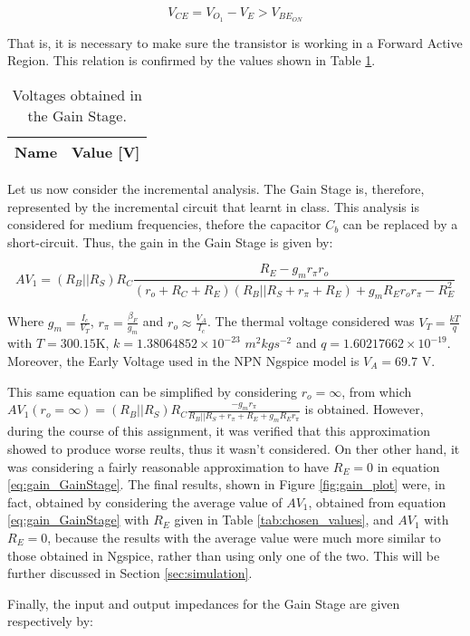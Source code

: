 \begin{equation} \label{eq:VCE}
  V_{CE}=V_{O_1}-V_E>V_{BE_{ON}}
\end{equation}

That is, it is necessary to make sure the transistor is working in a Forward Active Region. This relation is confirmed by the values shown in Table \ref{tab:vce_vbeon}.

\begin{table}[H]
  \centering
  \begin{tabular}{|c|c|}
    \hline    
    {\bf Name} & {\bf Value [V]} \\ \hline
    
  \end{tabular}
  \caption{Voltages obtained in the Gain Stage.}
  \label{tab:vce_vbeon}
\end{table}

Let us now consider the incremental analysis. The Gain Stage is, therefore, represented by the incremental circuit that learnt in class. This analysis is considered for medium frequencies, thefore the capacitor $C_b$ can be replaced by a short-circuit. Thus, the gain in the Gain Stage is given by:

\begin{equation} \label{eq:gain_GainStage}
  AV_1=(R_B||R_S)R_C\frac{R_E-g_mr_{\pi}r_o}{(r_o+R_C+R_E)(R_B||R_S+r_{\pi}+R_E)+g_mR_Er_or_{\pi}-R_E^2}
\end{equation}

Where $g_m=\frac{I_c}{V_T}$, $r_{\pi}=\frac{\beta_F}{g_m}$ and $r_o\approx\frac{V_A}{I_c}$. The thermal voltage considered was $V_T=\frac{kT}{q}$ with $T=300.15$K, $k=1.38064852\times10^{-23}$ $m^2kgs^{-2}$ and $q=1.60217662\times10^{-19}$. Moreover, the Early Voltage used in the NPN Ngspice model is $V_A=69.7$ V.
\par
This same equation can be simplified by considering $r_o=\infty$, from which $ AV_1 (r_o=\infty)=(R_B||R_S)R_C\frac{-g_mr_{\pi}}{R_B||R_S+r_{\pi}+R_E+g_mR_Er_{\pi}}$ is obtained. However, during the course of this assignment, it was verified that this approximation showed to produce worse reults, thus it wasn't considered. On ther other hand, it was considering a fairly reasonable approximation to have $R_E=0$ in equation \ref{eq:gain_GainStage}. The final results, shown in Figure \ref{fig:gain_plot} were, in fact, obtained by considering the average value of $AV_1$, obtained from equation \ref{eq:gain_GainStage} with $R_E$ given in Table \ref{tab:chosen_values}, and $AV_1$ with $R_E=0$, because the results with the average value were much more similar to those obtained in Ngspice, rather than using only one of the two. This will be further discussed in Section \ref{sec:simulation}.
\par
Finally, the input and output impedances for the Gain Stage are given respectively by:

